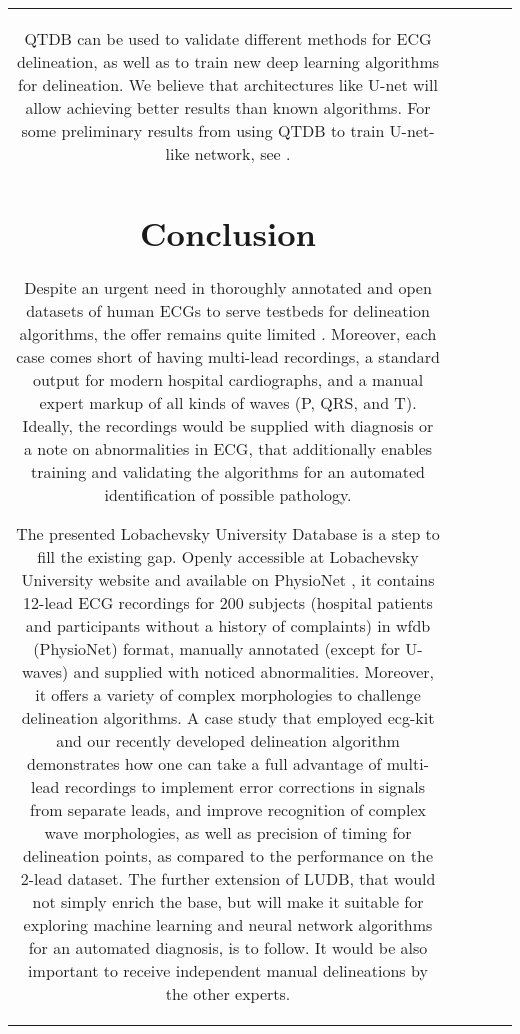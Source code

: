 \documentclass[submitted]{ieeeaccess}
\newcommand{\NewCorrection}[1]{{#1}}
\begin{document}
\begin{table}
\begin{tabular}{|c|c|c|c|c|}
\NewCorrection{QTDB can be used to validate different methods for ECG delineation, as well as to train new deep learning algorithms for delineation. We believe that architectures like U-net \cite{Ronneberger2015} will allow achieving better results than known algorithms. For some preliminary results from using QTDB to train U-net-like network, see \cite{Moskalenko2019}.}

\section{Conclusion}\label{conclusions}

Despite an urgent need in thoroughly annotated and open datasets of human ECGs to serve testbeds for delineation algorithms, the offer remains quite limited \cite{mitdb,edb,qtdb}. Moreover, each case comes short of having multi-lead recordings, a standard output for modern hospital cardiographs,  and a manual expert markup of all kinds of waves (P, QRS, and T). Ideally, the recordings would be supplied with diagnosis or a note on abnormalities in ECG, that additionally enables training and validating the algorithms for an automated identification of possible pathology. 

The presented Lobachevsky University Database is a step to fill the existing gap. Openly accessible at Lobachevsky University website and \NewCorrection{available on} PhysioNet \cite{Our_PhysioNet}, it contains 12-lead ECG recordings for 200 subjects (hospital patients and participants without a history of complaints) in wfdb (PhysioNet) format, manually annotated \NewCorrection{(except for U-waves)} and \NewCorrection{supplied} with noticed abnormalities. Moreover, it offers a variety of complex morphologies to challenge delineation algorithms. A case study that employed ecg-kit \cite{ECGKit} and our recently developed delineation algorithm \cite{Kalyakulina2018} demonstrates how one can take a full advantage of multi-lead recordings to implement error corrections in signals from separate leads, and improve recognition of complex wave morphologies, as well as precision of timing for delineation points, as compared to the performance on the 2-lead dataset. The further \NewCorrection{extension} of LUDB, that would not simply enrich the base, but will make it suitable for exploring machine learning and neural network algorithms for an automated diagnosis, is to follow. It would be also important to receive independent manual delineations by the other experts.


\end{tabular}
\end{table}
\end{document}

